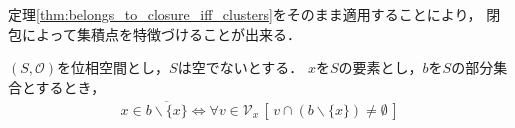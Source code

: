 	定理\ref{thm:belongs_to_closure_iff_clusters}をそのまま適用することにより，
	閉包によって集積点を特徴づけることが出来る．
	\begin{screen}
		\begin{thm}[集積点は閉包に捕らえられる]
			$(S,\mathscr{O})$を位相空間とし，$S$は空でないとする．
			$x$を$S$の要素とし，$b$を$S$の部分集合とするとき，
			\begin{align}
				x \in \overline{b \backslash \{x\}} \Longleftrightarrow
				\forall v \in \mathcal{V}_{x}\, \left[\, v \cap (b \backslash \{x\}) \neq \emptyset\, \right]
			\end{align}
		\end{thm}
	\end{screen}